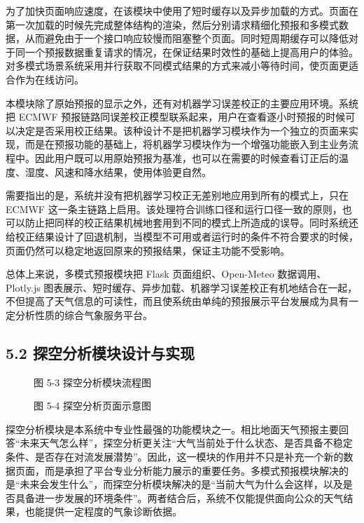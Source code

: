 为了加快页面响应速度，在该模块中使用了短时缓存以及异步加载的方式。页面在第一次加载的时候先完成整体结构的渲染，然后分别请求精细化预报和多模式数据，从而避免由于一个接口响应较慢而阻塞整个页面。同时短周期缓存可以降低对于同一个预报数据重复请求的情况，在保证结果时效性的基础上提高用户的体验。对多模式场景系统采用并行获取不同模式结果的方式来减小等待时间，使页面更适合作为在线访问。

本模块除了原始预报的显示之外，还有对机器学习误差校正的主要应用环境。系统把 ECMWF 预报链路同误差校正模型联系起来，用户在查看逐小时预报的时候可以决定是否采用校正结果。该种设计不是把机器学习模块作为一个独立的页面来实现，而是在预报功能的基础上，将机器学习模块作为一个增强功能嵌入到主业务流程中。因此用户既可以用原始预报为基准，也可以在需要的时候查看订正后的温度、湿度、风速和降水结果，使用体验更自然。

需要指出的是，系统并没有把机器学习校正无差别地应用到所有的模式上，只在 ECMWF 这一条主链路上启用。该处理符合训练口径和运行口径一致的原则，也可以防止把同样的校正结果机械地套用到不同的模式上所造成的误导。同时系统还给校正结果设计了回退机制，当模型不可用或者运行时的条件不符合要求的时候，页面仍然可以稳定地返回原来的预报结果，保证主功能不受影响。

总体上来说，多模式预报模块把 Flask 页面组织、Open-Meteo 数据调用、Plotly.js 图表展示、短时缓存、异步加载、机器学习误差校正有机地结合在一起，不但提高了天气信息的可读性，而且使系统由单纯的预报展示平台发展成为具有一定分析性质的综合气象服务平台。

\subsection{5.2 探空分析模块设计与实现}

\begin{figure}[htbp]
\centering
\caption{图 5-3  探空分析模块流程图}
\label{fig:5-3}
\end{figure}

\begin{figure}[htbp]
\centering
\caption{图 5-4  探空分析页面示意图}
\label{fig:5-4}
\end{figure}

探空分析模块是本系统中专业性最强的功能模块之一。相比地面天气预报主要回答“未来天气怎么样”，探空分析更关注“大气当前处于什么状态、是否具备不稳定条件、是否存在对流发展潜势”。因此，这一模块的作用并不只是补充一个新的数据页面，而是承担了平台专业分析能力展示的重要任务。多模式预报模块解决的是“未来会发生什么”，而探空分析模块解决的是“当前大气为什么会这样，以及是否具备进一步发展的环境条件”。两者结合后，系统不仅能提供面向公众的天气结果，也能提供一定程度的气象诊断依据。

